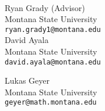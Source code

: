 \documentclass[10pt,letter]{moderncv}
\begin{document}
\begin{minipage}[t]{0.16\textwidth}
\
\end{minipage}
\begin{minipage}[t]{0.42\textwidth}


Ryan Grady  (Advisor)\\
Montana State University \\
\texttt{ryan.grady1@montana.edu} \\

David Ayala \\
Montana State University \\
\texttt{david.ayala@montana.edu} \\


\end{minipage}
\begin{minipage}[t]{0.42\textwidth}
Lukas Geyer\\
Montana State University\\
\texttt{geyer@math.montana.edu}


\end{minipage}
\end{document}
